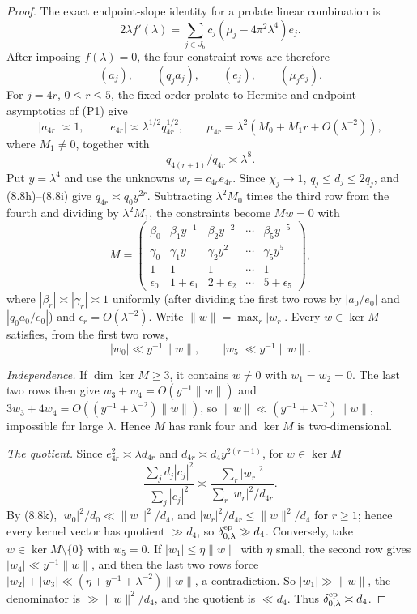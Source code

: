 \documentclass[11pt]{amsart}
\theoremstyle{definition}
\theoremstyle{remark}
\begin{document}
\begin{proof}
The exact endpoint-slope identity for a prolate linear combination is
\[
 2\lambda f'(\lambda)
 =\sum_{j\in J_6}c_j(\mu_j-4\pi^2\lambda^4)e_j.
\tag{8.8f}
\]
After imposing \(f(\lambda)=0\), the four constraint rows are therefore
\[
 (a_j),\qquad(q_ja_j),\qquad(e_j),\qquad(\mu_je_j).
\tag{8.8g}
\]
For \(j=4r\), \(0\le r\le5\), the fixed-order prolate-to-Hermite and
endpoint asymptotics of (P1) give
\[
 |a_{4r}|\asymp1,\qquad
 |e_{4r}|\asymp\lambda^{1/2}q_{4r}^{1/2},\qquad
 \mu_{4r}=\lambda^2(M_0+M_1r+O(\lambda^{-2})),
\tag{8.8h}
\]
where \(M_1\ne0\), together with
\[
 q_{4(r+1)}/q_{4r}\asymp\lambda^8.
\tag{8.8i}
\]
Put \(y=\lambda^4\) and use the unknowns \(w_r=c_{4r}e_{4r}\).  Since
\(\chi_j\to1\), \(q_j\le d_j\le2q_j\), and (8.8h)--(8.8i) give
\(q_{4r}\asymp q_0y^{2r}\).  Subtracting \(\lambda^2M_0\) times the third
row from the fourth and dividing by \(\lambda^2M_1\), the constraints
become \(Mw=0\) with
\[
 M=\begin{pmatrix}
 \beta_0&\beta_1y^{-1}&\beta_2y^{-2}&\cdots&\beta_5y^{-5}\\
 \gamma_0&\gamma_1y&\gamma_2y^2&\cdots&\gamma_5y^5\\
 1&1&1&\cdots&1\\
 \epsilon_0&1+\epsilon_1&2+\epsilon_2&\cdots&5+\epsilon_5
 \end{pmatrix},
\tag{8.8j}
\]
where \(|\beta_r|\asymp|\gamma_r|\asymp1\) uniformly (after dividing the
first two rows by \(|a_0/e_0|\) and \(|q_0a_0/e_0|\)) and
\(\epsilon_r=O(\lambda^{-2})\).  Write \(\|w\|=\max_r|w_r|\).  Every
\(w\in\ker M\) satisfies, from the first two rows,
\[
 |w_0|\ll y^{-1}\|w\|,\qquad |w_5|\ll y^{-1}\|w\|.
\tag{8.8k}
\]

\emph{Independence.}  If \(\dim\ker M\ge3\), it contains \(w\ne0\) with
\(w_1=w_2=0\).  The last two rows then give
\(w_3+w_4=O(y^{-1}\|w\|)\) and
\(3w_3+4w_4=O((y^{-1}+\lambda^{-2})\|w\|)\), so
\(\|w\|\ll(y^{-1}+\lambda^{-2})\|w\|\), impossible for large \(\lambda\).
Hence \(M\) has rank four and \(\ker M\) is two-dimensional.

\emph{The quotient.}  Since \(e_{4r}^2\asymp\lambda d_{4r}\) and
\(d_{4r}\asymp d_4y^{2(r-1)}\), for \(w\in\ker M\)
\[
 \frac{\sum_jd_j|c_j|^2}{\sum_j|c_j|^2}
 \asymp\frac{\sum_r|w_r|^2}{\sum_r|w_r|^2/d_{4r}} .
\]
By (8.8k), \(|w_0|^2/d_0\ll\|w\|^2/d_4\), and
\(|w_r|^2/d_{4r}\le\|w\|^2/d_4\) for \(r\ge1\); hence every kernel vector
has quotient \(\gg d_4\), so \(\delta_{0,\lambda}^{\rm ep}\gg d_4\).
Conversely, take \(w\in\ker M\setminus\{0\}\) with \(w_5=0\).  If
\(|w_1|\le\eta\|w\|\) with \(\eta\) small, the second row gives
\(|w_4|\ll y^{-1}\|w\|\), and then the last two rows force
\(|w_2|+|w_3|\ll(\eta+y^{-1}+\lambda^{-2})\|w\|\), a contradiction.  So
\(|w_1|\gg\|w\|\), the denominator is \(\gg\|w\|^2/d_4\), and the
quotient is \(\ll d_4\).  Thus \(\delta_{0,\lambda}^{\rm ep}\asymp d_4\).


\end{proof}
\end{document}
